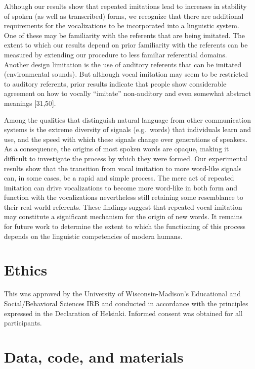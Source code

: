 \documentclass[english,floatsintext,man]{apa6}
\theoremstyle{definition}
\theoremstyle{definition}
\theoremstyle{definition}
\theoremstyle{remark}
\begin{document}
Although our results show that repeated imitations lead to increases in
stability of spoken (as well as transcribed) forms, we recognize that
there are additional requirements for the vocalizations to be
incorporated into a linguistic system. One of these may be familiarity
with the referents that are being imitated. The extent to which our
results depend on prior familiarity with the referents can be measured
by extending our procedure to less familiar referential domains. Another
design limitation is the use of auditory referents that can be imitated
(environmental sounds). But although vocal imitation may seem to be
restricted to auditory referents, prior results indicate that people
show considerable agreement on how to vocally \enquote{imitate}
non-auditory and even somewhat abstract meanings {[}31,50{]}.

Among the qualities that distinguish natural language from other
communication systems is the extreme diversity of signals (e.g.~words)
that individuals learn and use, and the speed with which these signals
change over generations of speakers. As a consequence, the origins of
most spoken words are opaque, making it difficult to investigate the
process by which they were formed. Our experimental results show that
the transition from vocal imitation to more word-like signals can, in
some cases, be a rapid and simple process. The mere act of repeated
imitation can drive vocalizations to become more word-like in both form
and function with the vocalizations nevertheless still retaining some
resemblance to their real-world referents. These findings suggest that
repeated vocal imitation may constitute a significant mechanism for the
origin of new words. It remains for future work to determine the extent
to which the functioning of this process depends on the linguistic
competencies of modern humans.

\hypertarget{ethics}{%
\section{Ethics}\label{ethics}}

This was approved by the University of Wisconsin-Madison's Educational
and Social/Behavioral Sciences IRB and conducted in accordance with the
principles expressed in the Declaration of Helsinki. Informed consent
was obtained for all participants.

\hypertarget{data-code-and-materials}{%
\section{Data, code, and materials}\label{data-code-and-materials}}
\end{document}
